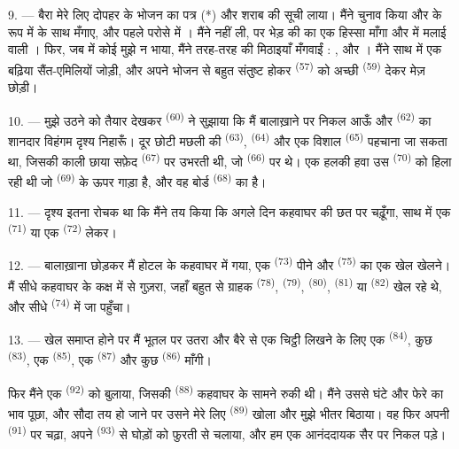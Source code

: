 9. --- बैरा मेरे लिए दोपहर के भोजन का पत्र (*) और शराब की सूची लाया। मैंने चुनाव
किया और  के रूप में  के साथ 
मँगाए, और पहले परोसे में । मैंने  नहीं
ली, पर भेड़ की  का एक हिस्सा माँगा और  में मलाई वाली
। फिर, जब  में कोई मुझे न भाया, मैंने
तरह-तरह की मिठाइयाँ मँगवाईं : ,  और ।
मैंने साथ में एक बढ़िया सैंत-एमिलियों  जोड़ी, और अपने भोजन से बहुत
संतुष्ट होकर  \textsuperscript{(57)} को अच्छी 
\textsuperscript{(59)} देकर मेज़ छोड़ी।

10. --- मुझे उठने को तैयार देखकर  \textsuperscript{(60)} ने सुझाया
कि मैं बालाख़ाने पर निकल आऊँ और  \textsuperscript{(62)} का शानदार
विहंगम दृश्य निहारूँ। दूर छोटी मछली की  \textsuperscript{(63)},
 \textsuperscript{(64)} और एक विशाल 
\textsuperscript{(65)} पहचाना जा सकता था, जिसकी काली छाया सफ़ेद 
\textsuperscript{(67)} पर उभरती थी, जो  \textsuperscript{(66)} पर
थे।
एक हलकी हवा उस  \textsuperscript{(70)} को हिला रही थी जो
 \textsuperscript{(69)} के ऊपर गाड़ा है, और वह बोर्ड
 \textsuperscript{(68)} का है।

\VUsaut{3.0mm}
\VUsaut{3.0mm}

11. --- दृश्य इतना रोचक था कि मैंने तय किया कि अगले दिन कहवाघर की छत पर चढ़ूँगा,
साथ में एक  \textsuperscript{(71)} या एक 
\textsuperscript{(72)} लेकर।

12. --- बालाख़ाना छोड़कर मैं होटल के कहवाघर में गया, एक 
\textsuperscript{(73)} पीने और  \textsuperscript{(75)} का एक खेल
खेलने। मैं सीधे कहवाघर के कक्ष में से गुज़रा, जहाँ बहुत से ग्राहक
 \textsuperscript{(78)},  \textsuperscript{(79)},
 \textsuperscript{(80)},  \textsuperscript{(81)} या
 \textsuperscript{(82)} खेल रहे थे, और सीधे
 \textsuperscript{(74)} में जा पहुँचा।

13. --- खेल समाप्त होने पर मैं भूतल पर उतरा और बैरे से एक चिट्ठी लिखने के लिए
एक  \textsuperscript{(84)}, कुछ 
\textsuperscript{(83)}, एक  \textsuperscript{(85)}, एक
 \textsuperscript{(87)} और कुछ  \textsuperscript{(86)}
माँगी।

फिर मैंने एक  \textsuperscript{(92)} को बुलाया, जिसकी
 \textsuperscript{(88)} कहवाघर के सामने रुकी थी। मैंने उससे घंटे और
फेरे का भाव पूछा, और सौदा तय हो जाने पर उसने मेरे लिए 
\textsuperscript{(89)} खोला और मुझे भीतर बिठाया। वह फिर अपनी 
\textsuperscript{(91)} पर चढ़ा, अपने  \textsuperscript{(93)} से घोड़ों
को फुरती से चलाया, और हम एक आनंददायक सैर पर निकल पड़े।
\VUsaut{6.0mm}
\VUfilet{22mm}
